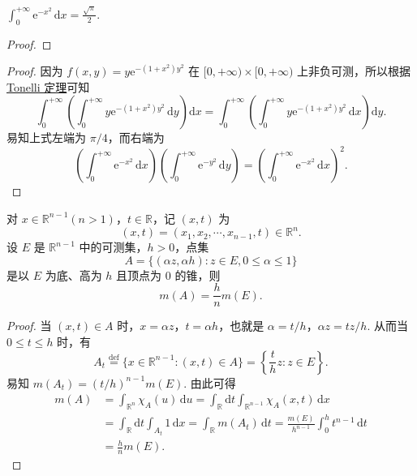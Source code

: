 \documentclass[../../main.tex]{subfiles}
\begin{document}
\begin{example}
$\int_0^{+\infty} \mathrm{e}^{-x^2} \, \mathrm{d}x = \frac{\sqrt{\pi}}{2}.$
\end{example}
\begin{proof}


\end{proof}
\begin{proof}
因为 \( f(x, y) = y \mathrm{e}^{-(1 + x^2)y^2} \) 在 \( [0, +\infty) \times [0, +\infty) \) 上非负可测，所以根据\hyperref[theorem:Tonelli 定理 非负可测函数的情形]{Tonelli 定理}可知
\[
\int_0^{+\infty} \left( \int_0^{+\infty} y \mathrm{e}^{-(1 + x^2)y^2} \, \mathrm{d}y \right) \mathrm{d}x = \int_0^{+\infty} \left( \int_0^{+\infty} y \mathrm{e}^{-(1 + x^2)y^2} \, \mathrm{d}x \right) \mathrm{d}y.
\]
易知上式左端为 \( \pi/4 \)，而右端为
\[
\left( \int_0^{+\infty} \mathrm{e}^{-x^2} \, \mathrm{d}x \right) \left( \int_0^{+\infty} \mathrm{e}^{-y^2} \, \mathrm{d}y \right) = \left( \int_0^{+\infty} \mathrm{e}^{-x^2} \, \mathrm{d}x \right)^2.
\]

\end{proof}

\begin{example}
对 \( x \in \mathbb{R}^{n - 1} (n > 1) \)，\( t \in \mathbb{R} \)，记 \( (x, t) \) 为
\[
(x, t) = (x_1, x_2, \cdots, x_{n - 1}, t) \in \mathbb{R}^n.
\]
设 \( E \) 是 \( \mathbb{R}^{n - 1} \) 中的可测集，\( h > 0 \)，点集
\[
A = \{ (\alpha z, \alpha h) : z \in E, 0 \leqslant \alpha \leqslant 1 \}
\]
是以 \( E \) 为底、高为 \( h \) 且顶点为 0 的锥，则
\[
m(A) = \frac{h}{n} m(E).
\]
\end{example}
\begin{proof}
当 \( (x, t) \in A \) 时，\( x = \alpha z \)，\( t = \alpha h \)，也就是 \( \alpha = t/h \)，\( \alpha z = t z / h \). 从而当 \( 0 \leqslant t \leqslant h \) 时，有
\[
A_t \stackrel{\text{def}}{=} \{ x \in \mathbb{R}^{n - 1} : (x, t) \in A \} = \left\{ \frac{t}{h} z : z \in E \right\}.
\]
易知 \( m(A_t) = (t/h)^{n - 1} m(E) \). 由此可得
\begin{align*}
m(A) &= \int_{\mathbb{R}^n} \chi_A(u) \, \mathrm{d}u = \int_{\mathbb{R}} \mathrm{d}t \int_{\mathbb{R}^{n - 1}} \chi_A(x, t) \, \mathrm{d}x \\
&= \int_{\mathbb{R}} \mathrm{d}t \int_{A_t} 1 \, \mathrm{d}x = \int_{\mathbb{R}} m(A_t) \, \mathrm{d}t = \frac{m(E)}{h^{n - 1}} \int_0^h t^{n - 1} \, \mathrm{d}t \\
&= \frac{h}{n} m(E).
\end{align*}

\end{proof}
\end{document}
